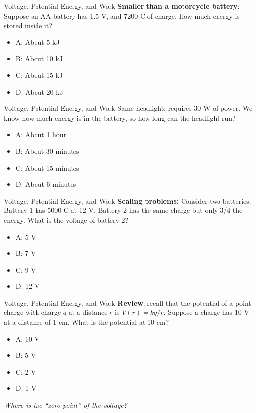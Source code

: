 \documentclass{beamer}
\begin{document}
\begin{frame}{Voltage, Potential Energy, and Work}
\textbf{Smaller than a motorcycle battery}: Suppose an AA battery has 1.5 V, and 7200 C of charge.  How much energy is stored inside it?
\begin{itemize}
\item A: About 5 kJ
\item B: About 10 kJ
\item C: About 15 kJ
\item D: About 20 kJ
\end{itemize}
\end{frame}

\begin{frame}{Voltage, Potential Energy, and Work}
Same headlight: requires 30 W of power.  We know how much energy is in the battery, so how long can the headlight run?
\begin{itemize}
\item A: About 1 hour
\item B: About 30 minutes
\item C: About 15 minutes
\item D: About 6 minutes
\end{itemize}
\end{frame}

\begin{frame}{Voltage, Potential Energy, and Work}
\textbf{Scaling problems:} Consider two batteries.  Battery 1 has 5000 C at 12 V.  Battery 2 has the same charge but only 3/4 the energy.  What is the voltage of battery 2?
\begin{itemize}
\item A: 5 V 
\item B: 7 V
\item C: 9 V
\item D: 12 V
\end{itemize}
\end{frame}

\begin{frame}{Voltage, Potential Energy, and Work}
\textbf{Review}: recall that the potential of a point charge with charge $q$ at a distance $r$ is $V(r) = kq/r$.  Suppose a charge has 10 V at a distance of 1 cm.  What is the potential at 10 cm?
\begin{itemize}
\item A: 10 V 
\item B: 5 V
\item C: 2 V
\item D: 1 V
\end{itemize}
\textit{Where is the ``zero point'' of the voltage?}
\end{frame}
\end{document}
